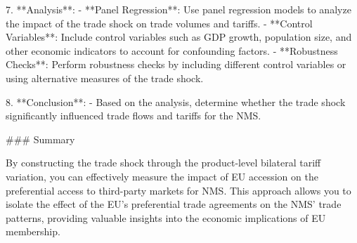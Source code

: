 7. **Analysis**:
   - **Panel Regression**: Use panel regression models to analyze the impact of the trade shock on trade volumes and tariffs.
   - **Control Variables**: Include control variables such as GDP growth, population size, and other economic indicators to account for confounding factors.
   - **Robustness Checks**: Perform robustness checks by including different control variables or using alternative measures of the trade shock.

8. **Conclusion**:
   - Based on the analysis, determine whether the trade shock significantly influenced trade flows and tariffs for the NMS.

### Summary

By constructing the trade shock through the product-level bilateral tariff variation, you can effectively measure the impact of EU accession on the preferential access to third-party markets for NMS. This approach allows you to isolate the effect of the EU's preferential trade agreements on the NMS' trade patterns, providing valuable insights into the economic implications of EU membership.